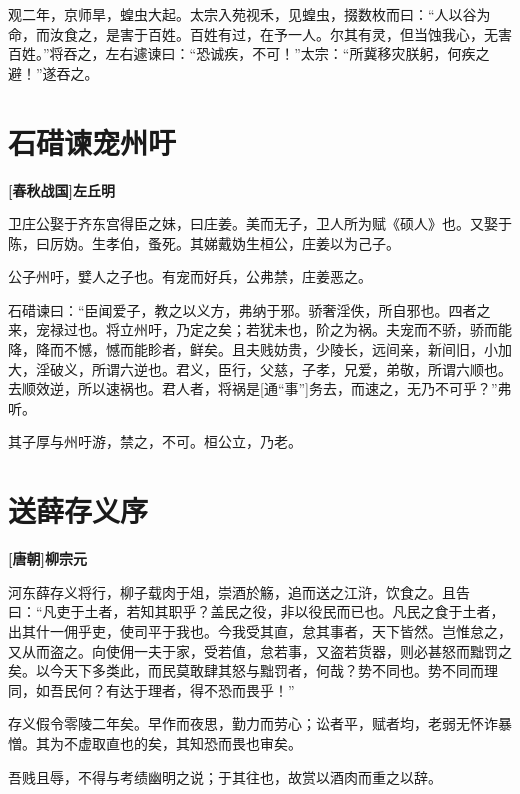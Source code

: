 \documentclass[UTF8,titlepage,oneside]{ctexbook}
\begin{document}
观二年，京师旱，蝗虫大起。太宗入苑视禾，见蝗虫，掇数枚而曰：“人以谷为命，而汝食之，是害于百姓。百姓有过，在予一人。尔其有灵，但当蚀我心，无害百姓。”将吞之，左右遽谏曰：“恐诚疾，不可！”太宗：“所冀移灾朕躬，何疾之避！”遂吞之。

\chapter*{石碏谏宠州吁}
\begin{center}
	\textbf{[春秋战国]左丘明}
\end{center}


卫庄公娶于齐东宫得臣之妹，曰庄姜。美而无子，卫人所为赋《硕人》也。又娶于陈，曰厉妫。生孝伯，蚤死。其娣戴妫生桓公，庄姜以为己子。


公子州吁，嬖人之子也。有宠而好兵，公弗禁，庄姜恶之。


石碏谏曰：“臣闻爱子，教之以义方，弗纳于邪。骄奢淫佚，所自邪也。四者之来，宠禄过也。将立州吁，乃定之矣；若犹未也，阶之为祸。夫宠而不骄，骄而能降，降而不憾，憾而能眕者，鲜矣。且夫贱妨贵，少陵长，远间亲，新间旧，小加大，淫破义，所谓六逆也。君义，臣行，父慈，子孝，兄爱，弟敬，所谓六顺也。去顺效逆，所以速祸也。君人者，将祸是[通“事”]务去，而速之，无乃不可乎？”弗听。


其子厚与州吁游，禁之，不可。桓公立，乃老。



\chapter*{送薛存义序}
\begin{center}
	\textbf{[唐朝]柳宗元}
\end{center}


河东薛存义将行，柳子载肉于俎，崇酒於觞，追而送之江浒，饮食之。且告曰：“凡吏于土者，若知其职乎？盖民之役，非以役民而已也。凡民之食于土者，出其什一佣乎吏，使司平于我也。今我受其直，怠其事者，天下皆然。岂惟怠之，又从而盗之。向使佣一夫于家，受若值，怠若事，又盗若货器，则必甚怒而黜罚之矣。以今天下多类此，而民莫敢肆其怒与黜罚者，何哉？势不同也。势不同而理同，如吾民何？有达于理者，得不恐而畏乎！”


存义假令零陵二年矣。早作而夜思，勤力而劳心；讼者平，赋者均，老弱无怀诈暴憎。其为不虚取直也的矣，其知恐而畏也审矣。


吾贱且辱，不得与考绩幽明之说；于其往也，故赏以酒肉而重之以辞。
\end{document}
